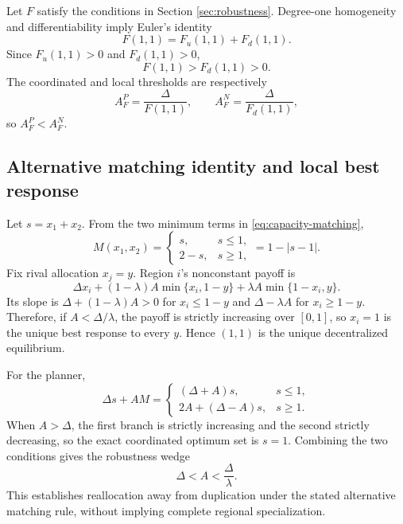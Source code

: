 Let $F$ satisfy the conditions in Section \ref{sec:robustness}. Degree-one homogeneity and differentiability imply Euler's identity
\[
F(1,1)=F_u(1,1)+F_d(1,1).
\]
Since $F_u(1,1)>0$ and $F_d(1,1)>0$,
\[
F(1,1)>F_d(1,1)>0.
\]
The coordinated and local thresholds are respectively
\[
A_F^P=\frac{\Delta}{F(1,1)},
\qquad
A_F^N=\frac{\Delta}{F_d(1,1)},
\]
so $A_F^P<A_F^N$.

\subsection{Alternative matching identity and local best response}

Let $s=x_1+x_2$. From the two minimum terms in \eqref{eq:capacity-matching},
\[
M(x_1,x_2)
=\begin{cases}
s, & s\leq1,\\
2-s, & s\geq1,
\end{cases}
=1-|s-1|.
\]
Fix rival allocation $x_j=y$. Region $i$'s nonconstant payoff is
\[
\Delta x_i+(1-\lambda)A\min\{x_i,1-y\}
+\lambda A\min\{1-x_i,y\}.
\]
Its slope is $\Delta+(1-\lambda)A>0$ for $x_i\leq1-y$ and $\Delta-\lambda A$ for $x_i\geq1-y$. Therefore, if $A<\Delta/\lambda$, the payoff is strictly increasing over $[0,1]$, so $x_i=1$ is the unique best response to every $y$. Hence $(1,1)$ is the unique decentralized equilibrium.

For the planner,
\[
\Delta s+A M
=\begin{cases}
(\Delta+A)s, & s\leq1,\\
2A+(\Delta-A)s, & s\geq1.
\end{cases}
\]
When $A>\Delta$, the first branch is strictly increasing and the second strictly decreasing, so the exact coordinated optimum set is $s=1$. Combining the two conditions gives the robustness wedge
\[
\Delta<A<\frac{\Delta}{\lambda}.
\]
This establishes reallocation away from duplication under the stated alternative matching rule, without implying complete regional specialization.
